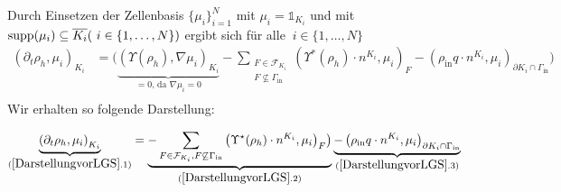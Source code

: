 Durch Einsetzen der Zellenbasis $ \{\mu_i\}_{i=1}^N $ mit $ \mu_i = \mathds{1}_{K_i} $  und mit $ \operatorname{supp}(\mu_i) \subseteq \overline{K_i} (\ i \in \{1, \dots , N\})$ ergibt sich für alle $\ i \in \{1, \dots , N\}$ 
\begin{align*}
\left(\partial_t \rho_h, \mu_i  \right)_{K_i}  &= \bigg( \underbrace{(\Upsilon(\rho_h), \nabla\mu_i)_{K_i}}_{=0 \text{, da } \nabla \mu_i = 0} - \sum_{\substack{F \in \mathcal{F}_{K_i} \\ F \not\subseteq \Gamma_{\text{in}}}} \left(\Upsilon^*(\rho_h) \cdot n^{K_i}, \mu_i \right)_{F} - \left(\rho_{\text{in}} q \cdot n^{K_i}, \mu_i \right)_{\partial K_i \cap \Gamma_{\text{in}}} \bigg) \\
\end{align*}
Wir erhalten so folgende Darstellung:

\begin{align}
\label{DarstellungvorLGS}
\underbrace{\left(\partial_t \rho_h, \mu_i  \right)_{K_i}}_{(\ref{DarstellungvorLGS}.1)} = 
\underbrace{-  \sum_{F \in \mathcal{F}_{K_i} , F \not \subseteq \Gamma_{\text{in}}}\left(\Upsilon^{\star}(\rho_h)\cdot n^{K_i},\mu_i\big)_F \right)}_{(\ref{DarstellungvorLGS}.2)} \underbrace{- \left(\rho_{\text{in}}q\cdot n^{K_i},\mu_i \right)_{\partial K_i \cap \Gamma_{\text{in}}}}_{(\ref{DarstellungvorLGS}.3)}
\end{align}

